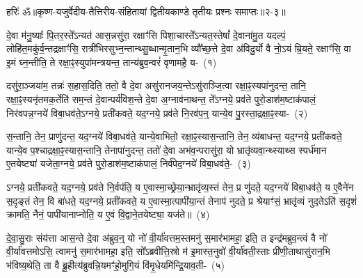 {\anuvakamend[{यु॒वं वी॒तमा॒ विवा॑सति॒ पन्था॑नो दीर्घया॒थैः सोम॑स्य॒ ता मद॒ इन्द्र॑श्चकार दे॒वा नव॑ च}]}%

{हरिः॑ ॐ}{॥कृष्ण-यजुर्वेदीय-तैत्तिरीय-संहितायां द्वितीयकाण्डे तृतीयः प्रश्नः समाप्तः॥२-३॥}



\setcounter{anuvakam}{0}
दे॒वा म॑नु॒ष्याः᳚ पि॒तर॒स्ते᳚\-ऽन्यत॑ आस॒न्नसु॑रा॒ रक्षाꣳ॑सि पिशा॒चास्ते᳚\-ऽन्यत॒स्तेषां᳚ दे॒वाना॑मु॒त यदल्पं॒ लोहि॑त॒मकु॑र्व॒न्तद्रक्षाꣳ॑सि॒ रात्री॑भिरसुभ्न॒न्तान्थ्सु॒ब्धान्मृ॒तान॒भि व्यौ᳚च्छ॒त्ते दे॒वा अ॑विदु॒र्यो वै नो॒\-ऽयं म्रि॒यते॒ रक्षाꣳ॑सि॒ वा इ॒मं घ्न॒न्तीति॒ ते रक्षा॒ꣴ॒स्युपा॑मन्त्रयन्त॒ तान्य॑ब्रुव॒न्वरं॑ वृणामहै॒ य-~(१)\ip

दसु॑रा॒ञ्जया॑म॒ तन्नः॑ स॒हास॒दिति॒ ततो॒ वै दे॒वा असु॑रानजय॒न्ते\-ऽसु॑राञ्जि॒त्वा रक्षा॒ꣴ॒स्यपा॑नुदन्त॒ तानि॒ रक्षा॒ꣴ॒स्यनृ॑तमक॒र्तेति॑ सम॒न्तं दे॒वान्पर्य॑विश॒न्ते दे॒वा अ॒ग्नाव॑नाथन्त॒ ते᳚\-ऽग्नये॒ प्रव॑ते पुरो॒डाश॑\-म॒ष्टा\-क॑पालं॒ निर॑वपन्न॒ग्नये॑ विबा॒धव॑ते॒\-ऽग्नये॒ प्रती॑कवते॒ यद॒ग्नये॒ प्रव॑ते नि॒रव॑प॒न्॒ यान्ये॒व पु॒रस्ता॒द्रक्षा॒ꣴ॒स्या-~(२)\ip

स॒न्तानि॒ तेन॒ प्राणु॑दन्त॒ यद॒ग्नये॑ विबा॒धव॑ते॒ यान्ये॒वाभितो॒ रक्षा॒ꣴ॒स्यास॒न्तानि॒ तेन॒ व्य॑बाधन्त॒ यद॒ग्नये॒ प्रती॑कवते॒ यान्ये॒व प॒श्चाद्रक्षा॒ꣴ॒स्यास॒न्तानि॒ तेनापा॑नुदन्त॒ ततो॑ दे॒वा अभ॑व॒न्परासु॑रा॒ यो भ्रातृ॑व्यवा॒न्थ्स्याथ्स स्पर्ध॑मान ए॒तयेष्ट्या॑ यजेता॒ग्नये॒ प्रव॑ते पुरो॒डाश॑\-म॒ष्टा\-क॑पालं॒ निर्व॑पेद॒ग्नये॑ विबा॒धव॑ते॒-~(३)\ip

ऽग्नये॒ प्रती॑कवते॒ यद॒ग्नये॒ प्रव॑ते नि॒र्वप॑ति॒ य ए॒वास्मा॒\-च्छ्रेया॒न्भ्रातृ॑व्य॒स्तं तेन॒ प्र णु॑दते॒ यद॒ग्नये॑ विबा॒धव॑ते॒ य ए॒वैने॑न स॒दृङ्तं तेन॒ वि बा॑धते॒ यद॒ग्नये॒ प्रती॑कवते॒ य ए॒वास्मा॒त्पापी॑या॒न्तं तेनाप॑ नुदते॒ प्र श्रेयाꣳ॑सं॒ भ्रातृ॑व्यं नुद॒ते\-ऽति॑ स॒दृशं॑ क्रामति॒ नैनं॒ पापी॑यानाप्नोति॒ य ए॒वं वि॒द्वाने॒तयेष्ट्या॒ यज॑ते॥~(४)\ip

{\anuvakamend[{वृ॒णा॒म॒है॒ यत्पु॒रस्ता॒द्रक्षाꣳ॑सि वपेद॒ग्नये॑ विबा॒धव॑त ए॒वं च॒त्वारि॑ च}]}

दे॒वा॒सु॒राः संय॑त्ता आस॒न्ते दे॒वा अ॑ब्रुव॒न्॒ यो नो॑ वी॒र्या॑वत्तम॒स्तमनु॑ स॒मार॑भामहा॒ इति॒ त इन्द्र॑मब्रुव॒न्त्वं वै नो॑ वी॒र्या॑वत्तमो\-ऽसि॒ त्वामनु॑ स॒मार॑भामहा॒ इति॒ सो᳚\-ऽब्रवीत्ति॒स्रो म॑ इ॒मास्त॒नुवो॑ वी॒र्या॑वती॒स्ताः प्री॑णी॒ताथासु॑रान॒भि भ॑विष्य॒थेति॒ ता वै ब्रू॒हीत्य॑ब्रुवन्नि॒यमꣳ॑हो॒मुगि॒यं वि॑मृ॒धेयमि॑न्द्रि॒याव॒ती-~(५)\ip

